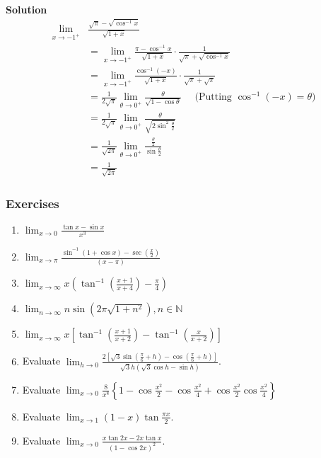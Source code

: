 \begin{enumerate}
\textbf{Solution}
$$
\begin{aligned}
\lim _{x \rightarrow-1^{+}} & \frac{\sqrt{\pi}-\sqrt{\cos ^{-1} x}}{\sqrt{1+x}} \\
& =\lim _{x \rightarrow-1^{+}} \frac{\pi-\cos ^{-1} x}{\sqrt{1+x}} \cdot \frac{1}{\sqrt{\pi}+\sqrt{\cos ^{-1} x}} \\
& =\lim _{x \rightarrow-1^{+}} \frac{\cos ^{-1}(-x)}{\sqrt{1+x}} \cdot \frac{1}{\sqrt{\pi}+\sqrt{\pi}} \\
& =\frac{1}{2 \sqrt{\pi}} \lim _{\theta \rightarrow 0^{+}} \frac{\theta}{\sqrt{1-\cos \theta}} \quad \text { (Putting } \cos ^{-1}(-x)=\theta ) \\
& =\frac{1}{2 \sqrt{\pi}} \lim _{\theta \rightarrow 0^{+}} \frac{\theta}{\sqrt{2 \sin ^2 \frac{\theta}{2}}} \\
& =\frac{1}{\sqrt{2 \pi}} \lim _{\theta \rightarrow 0^{+}} \frac{\frac{\theta}{2}}{\sin \frac{\theta}{2}} \\
& =\frac{1}{\sqrt{2 \pi}}
\end{aligned}
$$
\end{enumerate}


\subsubsection{Exercises}

\begin{enumerate}
    \item $\lim_{x\to 0} \frac{\tan x - \sin x}{x^3}$
    \item $\lim_{x\to\pi} \frac{\sin^{-1}(1+\cos x)-\sec (\frac{x}{2})}{(x-\pi)}$
    \item $\lim_{x\to \infty} x (\tan^{-1}(\frac{x+1}{x+4})-\frac{\pi}{4})$
    \item $\lim_{n \to \infty} n\sin(2\pi \sqrt{1+n^2}), n\in \mathbb{N}$
    \item $\lim_{x\to \infty} x \left[ \tan^{-1}(\frac{x+1}{x+2})- \tan^{-1}(\frac{x}{x+2})\right]$
    \item Evaluate $\lim _{h \rightarrow 0} \frac{2\left[\sqrt{3} \sin \left(\frac{\pi}{6}+h\right)-\cos \left(\frac{\pi}{6}+h\right)\right]}{\sqrt{3} h(\sqrt{3} \cos h-\sin h)}$.
    \item Evaluate $\lim _{x \rightarrow 0} \frac{8}{x^8}\left\{1-\cos \frac{x^2}{2}-\cos \frac{x^2}{4}+\cos \frac{x^2}{2} \cos \frac{x^2}{4}\right\}$
    \item Evaluate $\lim _{x \rightarrow 1}(1-x) \tan \frac{\pi x}{2}$.
    \item  Evaluate $\lim _{x \rightarrow 0} \frac{x \tan 2 x-2 x \tan x}{(1-\cos 2 x)^2}$.
\end{enumerate}


